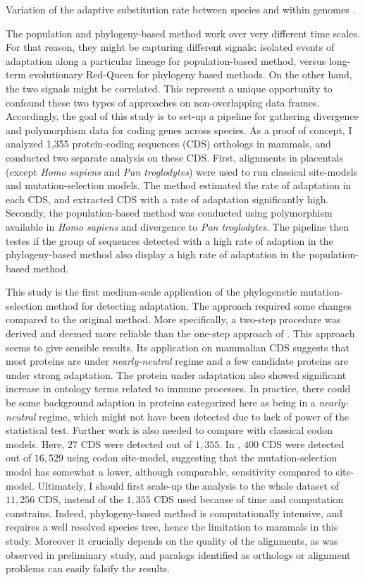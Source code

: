 Variation of the adaptive \gls{substitution} rate between species and within genomes \citep{Moutinho2019a}.

The population and phylogeny-based method work over very different time scales.
For that reason, they might be capturing different signals: isolated events of adaptation along a particular lineage for population-based method, versus long-term evolutionary Red-Queen for phylogeny based methods. On the other hand, the two signals might be correlated. This represent a unique opportunity to confound these two types of approaches on non-overlapping data frames. Accordingly, the goal of this study is to set-up a pipeline for gathering divergence and polymorphism data for coding genes across species. As a proof of concept, I analyzed 1,355 protein-coding sequences (CDS) orthologs in mammals, and conducted two separate analysis on these CDS. First, alignments in placentals (except \textit{Homo sapiens} and \textit{Pan troglodytes}) were used to run classical site-models and mutation-selection models. The method estimated the rate of adaptation in each CDS, and extracted CDS with a rate of adaptation significantly high. Secondly, the population-based method was conducted using polymorphism available in \textit{Homo sapiens} and divergence to \textit{Pan troglodytes}. The pipeline then testes if the group of sequences detected with a high rate of adaption in the phylogeny-based method also display a high rate of adaptation in the population-based method.

This study is the first medium-scale application of the phylogenetic mutation-selection method for detecting adaptation. The approach required some changes compared to the original method. More specifically, a two-step procedure was derived and deemed more reliable than the one-step approach of \citet{Lartillot2013}. This approach seems to give sensible results. Its application on mammalian CDS suggests that most proteins are under \textit{nearly-neutral} regime and a few candidate proteins are under strong adaptation. The protein under adaptation also showed significant increase in ontology terms related to immune processes. In practice, there could be some background adaption in proteins categorized here as being in a \textit{nearly-neutral} regime, which might not have been detected due to lack of power of the statistical test. Further work is also needed to compare with classical \gls{codon} models. Here, $27$ CDS were detected out of $1,355$. In \citet{kosiol_patterns_2008}, $400$ CDS were detected out of $16,529$ using \gls{codon} site-model, suggesting that the mutation-selection model has somewhat a lower, although comparable, sensitivity compared to site-model. Ultimately, I should first scale-up the analysis to the whole dataset of $11,256$ CDS, instead of the $1,355$ CDS used because of time and computation constrains. Indeed, phylogeny-based method is computationally intensive, and requires a well resolved species tree, hence the limitation to mammals in this study. Moreover it crucially depends on the quality of the alignments, as was observed in preliminary study, and paralogs identified as orthologs or alignment problems can easily falsify the results.\\

